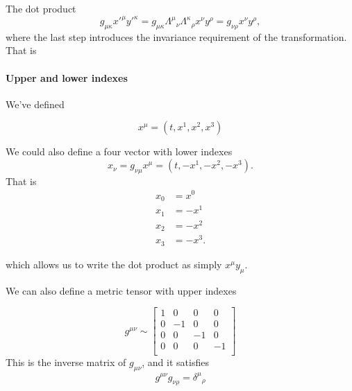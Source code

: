 The dot product
\begin{dmath}\label{eqn:qftLecture2:620}
g_{\mu \kappa}
{x'}^\mu
{y'}^\kappa
=
g_{\mu \kappa}
{\Lambda^\mu}_\nu
{\Lambda^\kappa}_\rho
x^\nu
y^\rho
=
g_{\nu\rho}
x^\nu
y^\rho,
\end{dmath}
where the last step introduces the invariance requirement of the transformation.  That is


\paragraph{Upper and lower indexes}

We've defined

\begin{dmath}\label{eqn:qftLecture2:660}
x^\mu = (t, x^1, x^2, x^3)
\end{dmath}

We could also define a four vector with lower indexes
\begin{dmath}\label{eqn:qftLecture2:680}
x_\nu = g_{\nu\mu} x^\mu = (t, -x^1, -x^2, -x^3).
\end{dmath}
That is
\begin{dmath}\label{eqn:qftLecture2:700}
\begin{aligned}
x_0 &= x^0 \\
x_1 &= -x^1 \\
x_2 &= -x^2 \\
x_3 &= -x^3.
\end{aligned}
\end{dmath}

which allows us to write the dot product as simply \( x^\mu y_\mu \).

We can also define a metric tensor with upper indexes

\begin{dmath}\label{eqn:qftLecture2:401}
g^{\mu\nu} \sim
\begin{bmatrix}
1 & 0 & 0 & 0 \\
0 & -1 & 0 & 0 \\
0 & 0 & -1 & 0 \\
0 & 0 & 0 & -1 \\
\end{bmatrix}
\end{dmath}
This is the inverse matrix of \( g_{\mu\nu} \), and it satisfies
\begin{dmath}\label{eqn:qftLecture2:720}
g^{\mu \nu} g_{\nu\rho} = {\delta^\mu}_\rho
\end{dmath}

